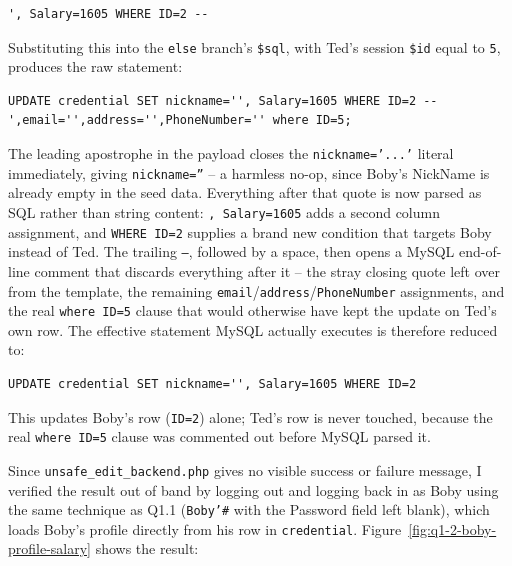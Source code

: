 \begin{lstlisting}
', Salary=1605 WHERE ID=2 --
\end{lstlisting}


Substituting this into the \texttt{else} branch's \texttt{\$sql}, with
Ted's session \texttt{\$id} equal to \texttt{5}, produces the raw statement:

\begin{lstlisting}[language={[MySQL]SQL}]
UPDATE credential SET nickname='', Salary=1605 WHERE ID=2 -- ',email='',address='',PhoneNumber='' where ID=5;
\end{lstlisting}

The leading apostrophe in the payload closes the \texttt{nickname='...'}
literal immediately, giving \texttt{nickname=''} -- a harmless no-op, since
Boby's NickName is already empty in the seed data. Everything after that
quote is now parsed as SQL rather than string content: \texttt{, Salary=1605}
adds a second column assignment, and \texttt{WHERE ID=2} supplies a brand new
condition that targets Boby instead of Ted. The trailing \texttt{--}, followed
by a space, then opens a MySQL end-of-line comment that discards everything
after it -- the stray closing quote left over from the template, the
remaining \texttt{email}/\texttt{address}/\texttt{PhoneNumber} assignments,
and the real \texttt{where ID=5} clause that would otherwise have kept the
update on Ted's own row. The effective statement MySQL actually executes is
therefore reduced to:

\begin{lstlisting}[language={[MySQL]SQL}]
UPDATE credential SET nickname='', Salary=1605 WHERE ID=2
\end{lstlisting}

This updates Boby's row (\texttt{ID=2}) alone; Ted's row is never touched,
because the real \texttt{where ID=5} clause was commented out before MySQL
parsed it.

Since \texttt{unsafe\_edit\_backend.php} gives no visible success or failure
message, I verified the result out of band by logging out and logging back
in as Boby using the same technique as Q1.1 (\texttt{Boby'\#} with the
Password field left blank), which loads Boby's profile directly from his row
in \texttt{credential}. Figure~\ref{fig:q1-2-boby-profile-salary} shows the
result:

